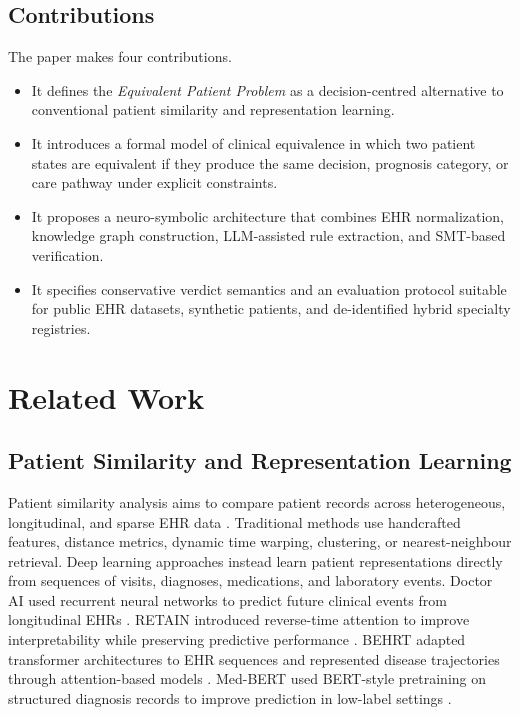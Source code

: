\documentclass[english,5p,twocolumn,preprint]{elsarticle}
\begin{document}
\subsection{Contributions}
The paper makes four contributions.
\begin{itemize}[leftmargin=*]
    \item It defines the \emph{Equivalent Patient Problem} as a decision-centred alternative to conventional patient similarity and representation learning.
    \item It introduces a formal model of clinical equivalence in which two patient states are equivalent if they produce the same decision, prognosis category, or care pathway under explicit constraints.
    \item It proposes a neuro-symbolic architecture that combines EHR normalization, knowledge graph construction, LLM-assisted rule extraction, and SMT-based verification.
    \item It specifies conservative verdict semantics and an evaluation protocol suitable for public EHR datasets, synthetic patients, and de-identified hybrid specialty registries.
\end{itemize}

\section{Related Work}
\subsection{Patient Similarity and Representation Learning}
Patient similarity analysis aims to compare patient records across heterogeneous, longitudinal, and sparse EHR data \cite{allam2021patient}. Traditional methods use handcrafted features, distance metrics, dynamic time warping, clustering, or nearest-neighbour retrieval. Deep learning approaches instead learn patient representations directly from sequences of visits, diagnoses, medications, and laboratory events. Doctor AI used recurrent neural networks to predict future clinical events from longitudinal EHRs \cite{choi2016doctorai}. RETAIN introduced reverse-time attention to improve interpretability while preserving predictive performance \cite{choi2016retain}. BEHRT adapted transformer architectures to EHR sequences and represented disease trajectories through attention-based models \cite{li2020behrt}. Med-BERT used BERT-style pretraining on structured diagnosis records to improve prediction in low-label settings \cite{rasmy2021medbert}. 
\end{document}
